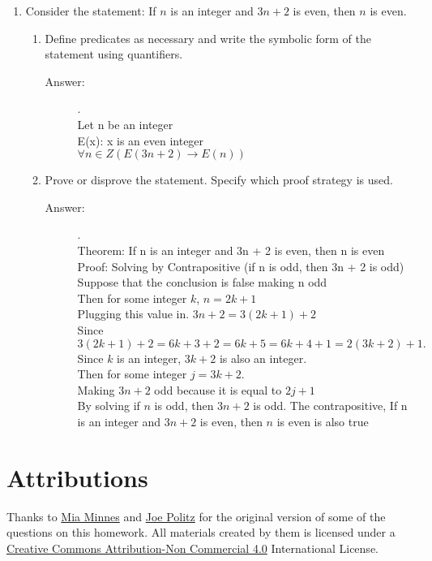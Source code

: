 \documentclass[12pt, oneside]{article}
\begin{document}
\begin{enumerate}
\item Consider the statement: If $n$ is an integer and $3n+2$ is even, then $n$ is even.
\begin{enumerate}
    \item Define predicates as necessary and write the symbolic form of the statement using quantifiers.
    \begin{description}
        \item[Answer:].\\
        Let n be an integer\\
        E(x): x is an even integer\\
        $\forall n \in Z(E(3n + 2) \rightarrow E(n)) $
    \end{description}
    \item Prove or disprove the statement. Specify which proof strategy is used.
    \begin{description}
        \item[Answer:].\\
        Theorem: If n is an integer and 3n + 2 is even, then n is even\\
        Proof: Solving by Contrapositive (if n is odd, then 3n + 2 is odd)\\
        Suppose that the conclusion is false making n odd\\
        Then for some integer $k$, $n = 2k + 1 $\\
        Plugging this value in. $3n + 2 = 3(2k + 1) + 2$\\
        Since $3(2k + 1) + 2 = 6k + 3 +  2 = 6k + 5 = 6k + 4 + 1=2(3k + 2)+1.$ \\
        Since $k$ is an integer, $3k + 2$ is also an integer. 	\\		
        Then for some integer $j = 3k + 2$.\\
                    Making $3n + 2$ odd because it is equal to $2j + 1$\\
        By solving if $n$ is odd, then $3n + 2$ is odd. The contrapositive, If n is an integer and $3n + 2$ is even, then $n$ is even is also true

    \end{description}
\end{enumerate}


\end{enumerate}
\section*{Attributions}

Thanks to \href{http://cseweb.ucsd.edu/~minnes/}{Mia Minnes} and \href{https://jpolitz.github.io/}{Joe Politz} for the original version of some of the questions on this homework. All materials created by them is licensed under a \href{http://creativecommons.org/licenses/by-nc/4.0/}{Creative Commons Attribution-Non Commercial 4.0} International License.
\end{document}
